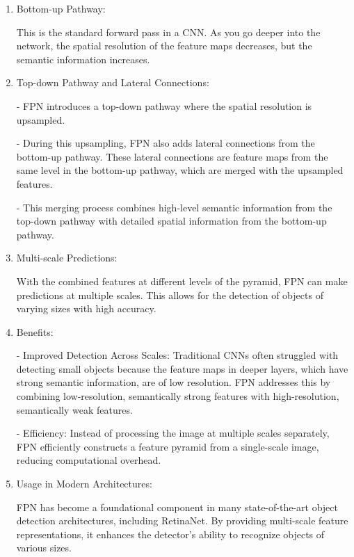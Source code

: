 \documentclass{article}
\begin{document}
\begin{enumerate}
  \item Bottom-up Pathway:
  
    This is the standard forward pass in a CNN. As you go deeper into the network, the spatial resolution of the feature maps decreases, but the semantic information increases.

  \item Top-down Pathway and Lateral Connections:
  
    - FPN introduces a top-down pathway where the spatial resolution is upsampled.

    - During this upsampling, FPN also adds lateral connections from the bottom-up pathway. These lateral connections are feature maps from the same level in the bottom-up pathway, which are merged with the upsampled features.
    
    - This merging process combines high-level semantic information from the top-down pathway with detailed spatial information from the bottom-up pathway.
  
  \item Multi-scale Predictions:
    
    With the combined features at different levels of the pyramid, FPN can make predictions at multiple scales. This allows for the detection of objects of varying sizes with high accuracy.

  \item Benefits:
  
    - Improved Detection Across Scales: Traditional CNNs often struggled with detecting small objects because the feature maps in deeper layers, which have strong semantic information, are of low resolution. FPN addresses this by combining low-resolution, semantically strong features with high-resolution, semantically weak features.

    - Efficiency: Instead of processing the image at multiple scales separately, FPN efficiently constructs a feature pyramid from a single-scale image, reducing computational overhead.

  \item Usage in Modern Architectures:
  
    FPN has become a foundational component in many state-of-the-art object detection architectures, including RetinaNet. By providing multi-scale feature representations, it enhances the detector's ability to recognize objects of various sizes.

\end{enumerate}
\end{document}
